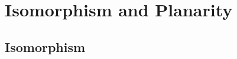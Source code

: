 
\newcommand{\laClass}       {CS 211}
\newcommand{\laSemester}    {Spring 2018}
\newcommand{\laChapter}     {7.3}
\newcommand{\laType}        {Exercise}
\newcommand{\laPoints}      {5}
\newcommand{\laTitle}       {Isomorphism and Planarity}
\newcommand{\laDate}        {}
\setcounter{chapter}{7}
\setcounter{section}{3}
\addtocounter{section}{-1}

\toggletrue{answerkey}
\togglefalse{answerkey}





    \section{\laTitle}

    \subsection{Isomorphism}

